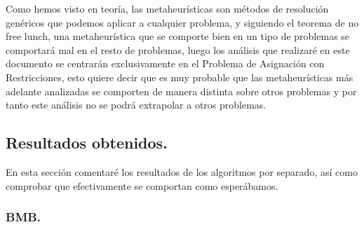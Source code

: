 \documentclass[12pt, spanish]{article}
\begin{document}
Como hemos visto en teoría, las metaheurísticas son métodos de resolución genéricos que podemos aplicar a cualquier problema, y siguiendo el teorema de no free lunch, una metaheurística que se comporte bien en un tipo de problemas se comportará mal en el resto de problemas, luego los análisis que realizaré en este documento se centrarán exclusivamente en el Problema de Asignación con Restricciones, esto quiere decir que es muy probable que las metaheurísticas más adelante analizadas se comporten de manera distinta sobre otros problemas y por tanto este análisis no se podrá extrapolar a otros problemas.

\newpage

\subsection{Resultados obtenidos.}

En esta sección comentaré los resultados de los algoritmos por separado, así como comprobar que efectivamente se comportan como esperábamos.

\subsubsection{BMB.}
\end{document}

